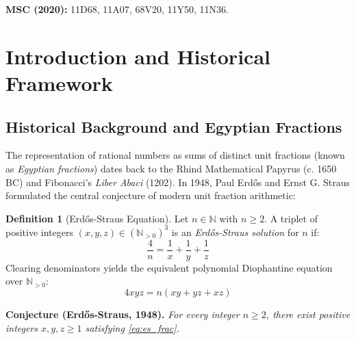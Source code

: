 \documentclass[11pt,a4paper]{article}
\theoremstyle{definition}
\newtheorem{definition}[theorem]{Definition}
\begin{document}
\noindent\textbf{MSC (2020):} 11D68, 11A07, 68V20, 11Y50, 11N36.

\tableofcontents
\newpage

\section{Introduction and Historical Framework}

\subsection{Historical Background and Egyptian Fractions}
The representation of rational numbers as sums of distinct unit fractions (known as \emph{Egyptian fractions}) dates back to the Rhind Mathematical Papyrus (c. 1650 BC) and Fibonacci's \emph{Liber Abaci} (1202). In 1948, Paul Erd\H{o}s and Ernst G. Straus formulated the central conjecture of modern unit fraction arithmetic:

\begin{definition}[Erd\H{o}s-Straus Equation]\label{def:es_eq}
Let $n \in \mathbb{N}$ with $n \ge 2$. A triplet of positive integers $(x, y, z) \in (\mathbb{N}_{>0})^3$ is an \emph{Erd\H{o}s-Straus solution} for $n$ if:
\begin{equation}\label{eq:es_frac}
\frac{4}{n} = \frac{1}{x} + \frac{1}{y} + \frac{1}{z}
\end{equation}
Clearing denominators yields the equivalent polynomial Diophantine equation over $\mathbb{N}_{>0}$:
\begin{equation}\label{eq:es_poly}
4 x y z = n (x y + y z + x z)
\end{equation}
\end{definition}

\noindent\textbf{Conjecture (Erd\H{o}s-Straus, 1948).} \textit{For every integer $n \ge 2$, there exist positive integers $x, y, z \ge 1$ satisfying \eqref{eq:es_frac}.}
\end{document}
